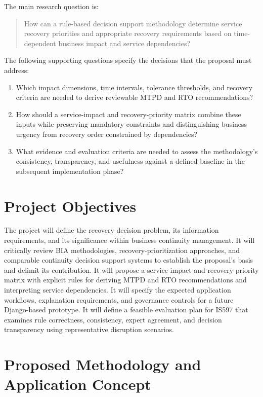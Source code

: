 The main research question is:
\begin{quote}
How can a rule-based decision support methodology determine service recovery priorities and appropriate recovery requirements based on time-dependent business impact and service dependencies?
\end{quote}

The following supporting questions specify the decisions that the proposal must address:
\begin{enumerate}[label=RQ\arabic*.,leftmargin=*]
  \item Which impact dimensions, time intervals, tolerance thresholds, and recovery criteria are needed to derive reviewable MTPD and RTO recommendations?
  \item How should a service-impact and recovery-priority matrix combine these inputs while preserving mandatory constraints and distinguishing business urgency from recovery order constrained by dependencies?
  \item What evidence and evaluation criteria are needed to assess the methodology's consistency, transparency, and usefulness against a defined baseline in the subsequent implementation phase?
\end{enumerate}

\section{Project Objectives}
\label{sec:intro-objectives}

The project will define the recovery decision problem, its information requirements, and its significance within business continuity management. It will critically review BIA methodologies, recovery-prioritization approaches, and comparable continuity decision support systems to establish the proposal's basis and delimit its contribution. It will propose a service-impact and recovery-priority matrix with explicit rules for deriving MTPD and RTO recommendations and interpreting service dependencies. It will specify the expected application workflows, explanation requirements, and governance controls for a future Django-based prototype. It will define a feasible evaluation plan for IS597 that examines rule correctness, consistency, expert agreement, and decision transparency using representative disruption scenarios.

\section{Proposed Methodology and Application Concept}
\label{sec:intro-concept}

